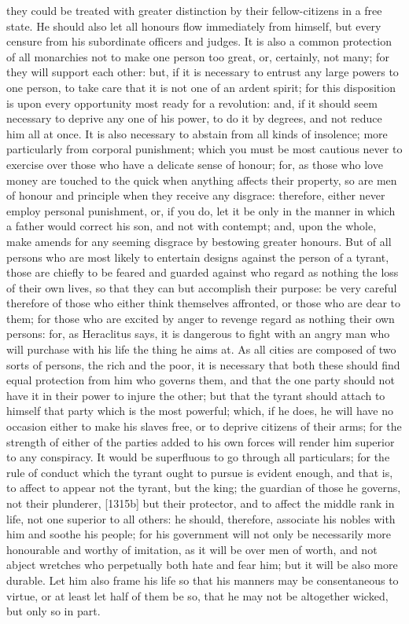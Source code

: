 \documentclass[12pt]{article}
\begin{document}
they could be treated with greater distinction by their fellow-citizens in a free state. He should also let all honours flow immediately from himself, but every censure from his subordinate officers and judges. It is also a common protection of all monarchies not to make one person too great, or, certainly, not many; for they will support each other: but, if it is necessary to entrust any large powers to one person, to take care that it is not one of an ardent spirit; for this disposition is upon every opportunity most ready for a revolution: and, if it should seem necessary to deprive any one of his power, to do it by degrees, and not reduce him all at once. It is also necessary to abstain from all kinds of insolence; more particularly from corporal punishment; which you must be most cautious never to exercise over those who have a delicate sense of honour; for, as those who love money are touched to the quick when anything affects their property, so are men of honour and principle when they receive any disgrace: therefore, either never employ personal punishment, or, if you do, let it be only in the manner in which a father would correct his son, and not with contempt; and, upon the whole, make amends for any seeming disgrace by bestowing greater honours. But of all persons who are most likely to entertain designs against the person of a tyrant, those are chiefly to be feared and guarded against who regard as nothing the loss of their own lives, so that they can but accomplish their purpose: be very careful therefore of those who either think themselves affronted, or those who are dear to them; for those who are excited by anger to revenge regard as nothing their own persons: for, as Heraclitus says, it is dangerous to fight with an angry man who will purchase with his life the thing he aims at. As all cities are composed of two sorts of persons, the rich and the poor, it is necessary that both these should find equal protection from him who governs them, and that the one party should not have it in their power to injure the other; but that the tyrant should attach to himself that party which is the most powerful; which, if he does, he will have no occasion either to make his slaves free, or to deprive citizens of their arms; for the strength of either of the parties added to his own forces will render him superior to any conspiracy. It would be superfluous to go through all particulars; for the rule of conduct which the tyrant ought to pursue is evident enough, and that is, to affect to appear not the tyrant, but the king; the guardian of those he governs, not their plunderer, [1315b] but their protector, and to affect the middle rank in life, not one superior to all others: he should, therefore, associate his nobles with him and soothe his people; for his government will not only be necessarily more honourable and worthy of imitation, as it will be over men of worth, and not abject wretches who perpetually both hate and fear him; but it will be also more durable. Let him also frame his life so that his manners may be consentaneous to virtue, or at least let half of them be so, that he may not be altogether wicked, but only so in part.
\end{document}
